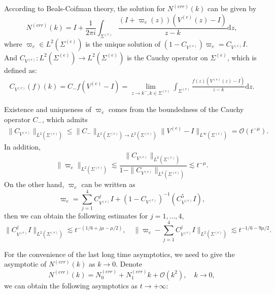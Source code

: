 \documentclass[11pt]{article}
\numberwithin{equation}{section}
\begin{document}
According to Beals-Coifman theory, the solution for $N^{(err)}(k)$ can be given by
\begin{equation}\label{eq63}
N^{(err)}(k) = I + \frac{1}{2\pi i} \int_{\Sigma^{(e)}} \frac{(I + \varpi_e(z))(V^{(e)}(z) - I)}{z - k} \mathrm{d}z,
\end{equation}
where $\varpi_e \in L^2(\Sigma^{(e)})$ is the unique solution of $(1 - C_{V^{(e)}})\varpi_e = C_{V^{(e)}} I$. And $C_{V^{(e)}}: L^2(\Sigma^{(e)}) \to L^2(\Sigma^{(e)})$ is the Cauchy operator on $\Sigma^{(e)}$, which is defined as:
\begin{align*}
C_{V^{(e)}}(f)(k) = C_{-}f(V^{(e)} - I) = \lim_{z \to k^-, k \in \Sigma^{(e)}} \int_{\Sigma^{(e)}} \frac{f(z)(V^{(e)}(z) - I)}{z - k} \mathrm{d}z.
\end{align*}

Existence and uniqueness of $\varpi_e$ comes from the boundedness of the Cauchy operator $C_{-}$, which admits
\begin{align}
\|C_{V^{(e)}}\|_{L^2(\Sigma^{(e)})} \leqslant \|C_{-}\|_{L^2(\Sigma^{(e)}) \to L^2(\Sigma^{(e)})} \|V^{(e)} - I\|_{L^\infty(\Sigma^{(e)})} = \mathcal{O}(t^{-\mu}).
\end{align}
In addition,
\begin{equation}
    \|\varpi_e\|_{L^2(\Sigma^{(e)})} \lesssim \frac{\|C_{V^{(e)}}\|_{L^2(\Sigma^{(e)})}}{1 - \|C_{V^{(e)}}\|_{L^2(\Sigma^{(e)})}} \lesssim t^{-\mu}.
\end{equation}
On the other hand, $\varpi_e$ can be written as
$$
 \varpi_e=\sum_{j=1}^4 C_{V^{(e)}}^j I+\left(1-C_{V^{(e)}}\right)^{-1}\left(C_{V^{(e)}}^5 I\right),
$$
then we can obtain the following estimates for $j=1,\dots,4,$
\begin{equation}
\|C^j_{V^{(e)}}I\|_{L^2(\Sigma^{(e)})}\lesssim t^{-(1/6+j\mu-\mu/2)},\quad  \|\varpi_e-\sum_{j=1}^4C^j_{V^{(e)}}I\|_{L^2(\Sigma^{(e)})}\lesssim t^{-1/6-9\mu/2}.\label{esti}
\end{equation}

For the convenience of the last long time asymptotics, we need to give the asymptotic of $N^{(err)}(k)$ as $k\to0$. Denote
\begin{equation*}
    N^{(err)}(k)=N^{(err)}_0+N^{(err)}_1k+\mathcal{O}(k^2),\quad k\to0,
\end{equation*}
we can obtain the following asymptotics as $t\to+\infty$:
\end{document}
